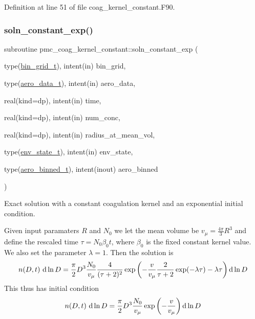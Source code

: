 Definition at line 51 of file coag\+\_\+kernel\+\_\+constant.\+F90.

\mbox{\label{namespacepmc__coag__kernel__constant_a9b2f8e22413812fde935ce8afaca32d9}} 
\subsubsection{\texorpdfstring{soln\+\_\+constant\+\_\+exp()}{soln\_constant\_exp()}}
{\footnotesize\ttfamily subroutine pmc\+\_\+coag\+\_\+kernel\+\_\+constant\+::soln\+\_\+constant\+\_\+exp (\begin{DoxyParamCaption}\item[{type(\mbox{\hyperlink{structpmc__bin__grid_1_1bin__grid__t}{bin\+\_\+grid\+\_\+t}}), intent(in)}]{bin\+\_\+grid,  }\item[{type(\mbox{\hyperlink{structpmc__aero__data_1_1aero__data__t}{aero\+\_\+data\+\_\+t}}), intent(in)}]{aero\+\_\+data,  }\item[{real(kind=dp), intent(in)}]{time,  }\item[{real(kind=dp), intent(in)}]{num\+\_\+conc,  }\item[{real(kind=dp), intent(in)}]{radius\+\_\+at\+\_\+mean\+\_\+vol,  }\item[{type(\mbox{\hyperlink{structpmc__env__state_1_1env__state__t}{env\+\_\+state\+\_\+t}}), intent(in)}]{env\+\_\+state,  }\item[{type(\mbox{\hyperlink{structpmc__aero__binned_1_1aero__binned__t}{aero\+\_\+binned\+\_\+t}}), intent(inout)}]{aero\+\_\+binned }\end{DoxyParamCaption})}



Exact solution with a constant coagulation kernel and an exponential initial condition. 

Given input paramaters $R$ and $N_0$ we let the mean volume be $v_\mu = \frac{4\pi}{3} R^3$ and define the rescaled time $\tau = N_0 \beta_0 t$, where $\beta_0$ is the fixed constant kernel value. We also set the parameter $\lambda = 1$. Then the solution is \[ n(D,t) \ {\rm d}\ln D = \frac{\pi}{2} D^3 \frac{N_0}{v_\mu} \frac{4}{(\tau + 2)^2} \exp\left(-\frac{v}{v_\mu} \frac{2}{\tau + 2} \exp(-\lambda \tau) - \lambda \tau\right) {\rm d}\ln D \] This thus has initial condition \[ n(D,t) \ {\rm d}\ln D = \frac{\pi}{2} D^3 \frac{N_0}{v_\mu} \exp\left(-\frac{v}{v_\mu}\right) {\rm d}\ln D \]



